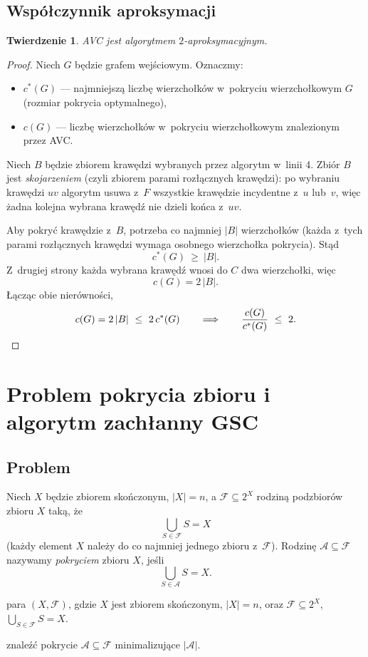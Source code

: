 \documentclass[11pt,a4paper]{article}
\theoremstyle{plain}
\newtheorem{twierdzenie}{Twierdzenie}[section]
\theoremstyle{definition}
\newcommand{\F}{\mathcal{F}}
\newcommand{\Acov}{\mathcal{A}}
\begin{document}
\subsection*{Współczynnik aproksymacji}
\begin{twierdzenie}\label{tw:avc}
\textsc{AVC} jest algorytmem $2$-aproksymacyjnym.
\end{twierdzenie}

\begin{proof}
Niech $G$ będzie grafem wejściowym. Oznaczmy:
\begin{itemize}[leftmargin=1.6em,itemsep=1pt]
\item $c^{*}(G)$ --- najmniejszą liczbę wierzchołków w~pokryciu wierzchołkowym $G$
(rozmiar pokrycia optymalnego),
\item $c(G)$ --- liczbę wierzchołków w~pokryciu wierzchołkowym znalezionym przez \textsc{AVC}.
\end{itemize}
Niech $B$ będzie zbiorem krawędzi wybranych przez algorytm w~linii 4. Zbiór $B$ jest
\emph{skojarzeniem} (czyli zbiorem parami rozłącznych krawędzi): po wybraniu krawędzi $uv$
algorytm usuwa z~$F$ wszystkie krawędzie incydentne z~$u$ lub~$v$, więc żadna kolejna
wybrana krawędź nie dzieli końca z~$uv$.

Aby pokryć krawędzie z~$B$, potrzeba co najmniej $|B|$ wierzchołków (każda z~tych
parami rozłącznych krawędzi wymaga osobnego wierzchołka pokrycia). Stąd
\[
c^{*}(G)\ \ge\ |B|.
\]
Z~drugiej strony każda wybrana krawędź wnosi do $C$ dwa wierzchołki, więc
\[
c(G)=2\,|B|.
\]
Łącząc obie nierówności,
\[
c(G)=2\,|B|\ \le\ 2\,c^{*}(G)
\qquad\Longrightarrow\qquad
\frac{c(G)}{c^{*}(G)}\ \le\ 2. \qedhere
\]
\end{proof}

\section{Problem pokrycia zbioru i algorytm zachłanny GSC}\label{sec:sc}

\subsection*{Problem}
Niech $X$ będzie zbiorem skończonym, $|X|=n$, a $\F\subseteq 2^{X}$ rodziną podzbiorów
zbioru $X$ taką, że
\[
\bigcup_{S\in\F}S=X
\]
(każdy element $X$ należy do co najmniej jednego zbioru z~$\F$). Rodzinę $\Acov\subseteq\F$
nazywamy \emph{pokryciem} zbioru $X$, jeśli
\[
\bigcup_{S\in\Acov}S=X.
\]

\begin{description}[leftmargin=2em]
\item[Instancja:] para $(X,\F)$, gdzie $X$ jest zbiorem skończonym, $|X|=n$,
oraz $\F\subseteq 2^{X}$, $\bigcup_{S\in\F}S=X$.
\item[Problem:] znaleźć pokrycie $\Acov\subseteq\F$ minimalizujące $|\Acov|$.
\end{description}
\end{document}
